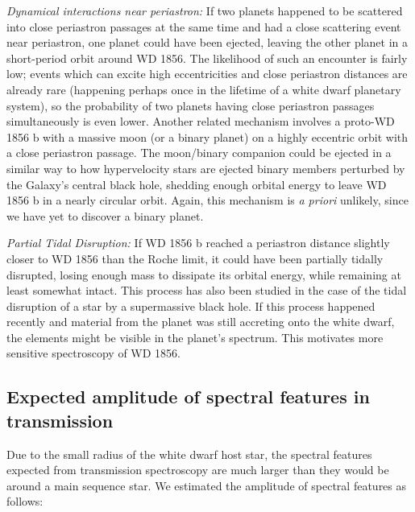 \documentclass{nature3}
\newcommand*{\bedit}{\textcolor{new_black}}
\begin{document}
\begin{methods}
\textit{Dynamical interactions near periastron:} If two planets happened to be scattered into close periastron passages at the same time and had a close scattering event near periastron, one planet could have been ejected, leaving the other planet in a short-period orbit around WD 1856. The likelihood of such an encounter is fairly low; events which can excite high eccentricities and close periastron distances are already rare (happening perhaps once in the lifetime of a white dwarf planetary system\cite{verasunpacking}), so the probability of two planets having close periastron passages simultaneously is even lower. Another related mechanism involves a proto-WD 1856 b with a massive moon (or a binary planet) on a highly eccentric orbit with a close periastron passage. The moon/binary companion could be ejected\cite{Payne2016} in a similar way to how hypervelocity stars are ejected binary members perturbed by the Galaxy's central black hole\cite{Bromley2012}, shedding enough orbital energy to leave WD 1856 b in a nearly circular orbit.  Again, this \bedit{mechanism} is \textit{a priori} unlikely, since we have yet to discover a binary planet. 

\textit{Partial Tidal Disruption:} If WD 1856 b reached a periastron distance slightly closer to WD 1856 than the Roche limit, it could have been partially tidally disrupted, losing enough mass to dissipate its orbital energy, while remaining at least somewhat intact\cite{faber}. This process has also been studied in the case of the tidal disruption of a star by a supermassive black hole\cite{Mainetti17}. If this process happened recently and material from the planet was still accreting onto the white dwarf, the elements might be visible in the planet's spectrum. This motivates more sensitive spectroscopy of WD 1856. 


\subsection{Expected amplitude of spectral features in transmission}
Due to the small radius of the white dwarf host star, the spectral features expected from transmission spectroscopy are much larger than they would be around a main sequence star. We estimated the amplitude of spectral features as follows:


\end{methods}
\end{document}
